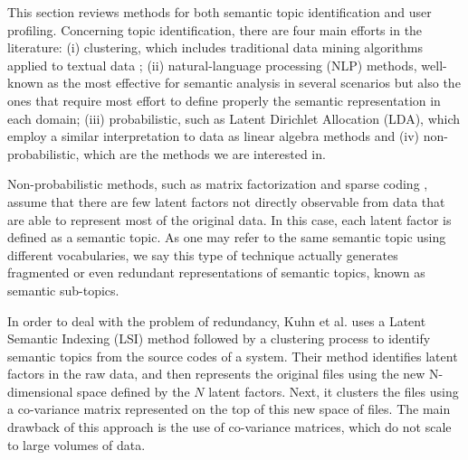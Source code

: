 This section reviews methods for both semantic
topic identification and user profiling.
Concerning topic identification, there are four main efforts in the literature: (i) clustering, which includes traditional data mining algorithms applied to textual data \cite{aggarwal2012mining}; (ii) natural-language processing (NLP) methods, well-known as the most effective for semantic analysis in several scenarios \cite{mihalcea2011graph} but also the ones that require most effort to define properly the semantic representation in each domain; (iii) probabilistic, such as Latent Dirichlet Allocation (LDA), which employ a similar interpretation to data as linear algebra methods and (iv) non-probabilistic, which are the methods we are interested in.



Non-probabilistic methods, such as matrix
factorization and sparse coding
\cite{bai:2013,cheng:2013}, assume that there are few latent factors not directly observable from
data that are able to represent most of the original data.  In this case,
each latent factor is defined as a semantic topic. 
As one may refer to the same semantic topic using different vocabularies, we say this type of technique actually generates fragmented or even redundant representations
of semantic topics, known as semantic sub-topics. 

In order to deal with the problem of redundancy, Kuhn et al.
\cite{kuhn2007semantic} uses a Latent Semantic Indexing (LSI) method followed
by a clustering process to identify semantic topics from the source codes of a
system. 
Their method identifies latent factors in the raw data, and then represents
the original files using the new N-dimensional space defined by the $N$ latent
factors. Next, it clusters the files using a co-variance matrix  represented
on the top of this new space of files. 
The main drawback of this approach is the use of co-variance
matrices, which do not scale to large volumes of data.

